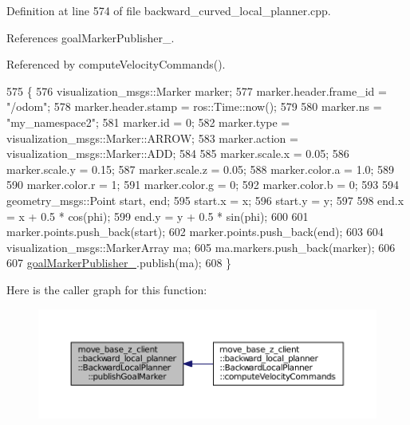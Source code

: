 Definition at line 574 of file backward\+\_\+curved\+\_\+local\+\_\+planner.\+cpp.



References goal\+Marker\+Publisher\+\_\+.



Referenced by compute\+Velocity\+Commands().


\begin{DoxyCode}
575 \{
576     visualization\_msgs::Marker marker;
577     marker.header.frame\_id = \textcolor{stringliteral}{"/odom"};
578     marker.header.stamp = ros::Time::now();
579 
580     marker.ns = \textcolor{stringliteral}{"my\_namespace2"};
581     marker.id = 0;
582     marker.type = visualization\_msgs::Marker::ARROW;
583     marker.action = visualization\_msgs::Marker::ADD;
584 
585     marker.scale.x = 0.05;
586     marker.scale.y = 0.15;
587     marker.scale.z = 0.05;
588     marker.color.a = 1.0;
589 
590     marker.color.r = 1;
591     marker.color.g = 0;
592     marker.color.b = 0;
593 
594     geometry\_msgs::Point start, end;
595     start.x = x;
596     start.y = y;
597 
598     end.x = x + 0.5 * cos(phi);
599     end.y = y + 0.5 * sin(phi);
600 
601     marker.points.push\_back(start);
602     marker.points.push\_back(end);
603 
604     visualization\_msgs::MarkerArray ma;
605     ma.markers.push\_back(marker);
606 
607     \hyperlink{classmove__base__z__client_1_1backward__local__planner_1_1BackwardLocalPlanner_a7228d3fe90bc48b486e5c46d6ac5e815}{goalMarkerPublisher\_}.publish(ma);
608 \}
\end{DoxyCode}


Here is the caller graph for this function\+:
\nopagebreak
\begin{figure}[H]
\begin{center}
\leavevmode
\includegraphics[width=350pt]{classmove__base__z__client_1_1backward__local__planner_1_1BackwardLocalPlanner_a691e565d33666d2f7004e791cae29b42_icgraph}
\end{center}
\end{figure}


